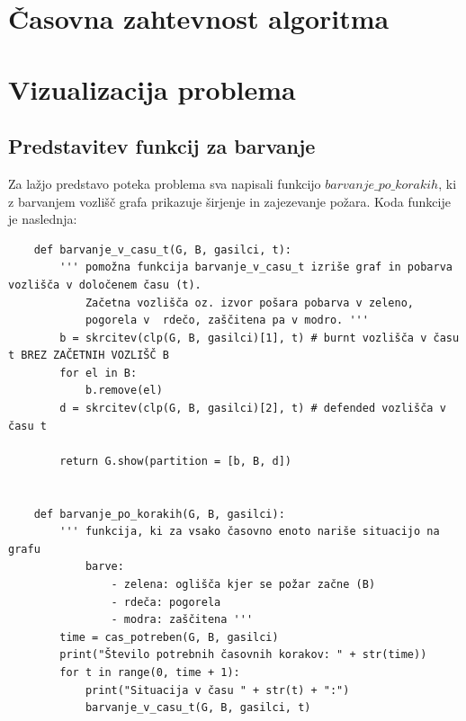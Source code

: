 \documentclass[a4paper, 12pt]{article}
\begin{document}
\section{Časovna zahtevnost algoritma}


\pagebreak

\section{Vizualizacija problema}

\subsection{Predstavitev funkcij za barvanje}

\noindent Za lažjo predstavo poteka problema sva napisali funkcijo $barvanje\_po\_korakih$, ki z barvanjem
vozlišč grafa prikazuje širjenje in zajezevanje požara. Koda funkcije je naslednja:

\begin{scriptsize}
\begin{verbatim}
    def barvanje_v_casu_t(G, B, gasilci, t):
        ''' pomožna funkcija barvanje_v_casu_t izriše graf in pobarva vozlišča v določenem času (t). 
            Začetna vozlišča oz. izvor pošara pobarva v zeleno, 
            pogorela v  rdečo, zaščitena pa v modro. '''
        b = skrcitev(clp(G, B, gasilci)[1], t) # burnt vozlišča v času t BREZ ZAČETNIH VOZLIŠČ B
        for el in B:
            b.remove(el)
        d = skrcitev(clp(G, B, gasilci)[2], t) # defended vozlišča v času t
        
        return G.show(partition = [b, B, d])


    def barvanje_po_korakih(G, B, gasilci):
        ''' funkcija, ki za vsako časovno enoto nariše situacijo na grafu
            barve:
                - zelena: oglišča kjer se požar začne (B)
                - rdeča: pogorela
                - modra: zaščitena '''
        time = cas_potreben(G, B, gasilci)
        print("Število potrebnih časovnih korakov: " + str(time))
        for t in range(0, time + 1):
            print("Situacija v času " + str(t) + ":")
            barvanje_v_casu_t(G, B, gasilci, t)\end{verbatim}
\end{scriptsize}
\end{document}
